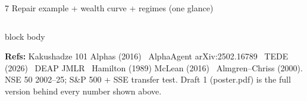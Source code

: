 \documentclass[final]{beamer}
\begin{document}
\begin{frame}[t]
\begin{columns}[t,onlytextwidth]
\begin{block}{7 Repair example + wealth curve + regimes (one glance)}
\end{block}
\end{columns}
\vskip0.25cm
\begin{beamercolorbox}[wd=\textwidth,sep=0.3cm]{block body}
{\small\raggedright
\textbf{Refs:} Kakushadze 101 Alphas (2016) \textbullet\ AlphaAgent arXiv:2502.16789 \textbullet\ TEDE (2026) \textbullet\ DEAP JMLR \textbullet\ Hamilton (1989) McLean (2016) \textbullet\ Almgren--Chriss (2000).
NSE 50 2002--25; S\&P 500 + SSE transfer test. Draft 1 (poster.pdf) is the full version behind every number shown above.
}
\end{beamercolorbox}
\end{frame}
\end{document}
